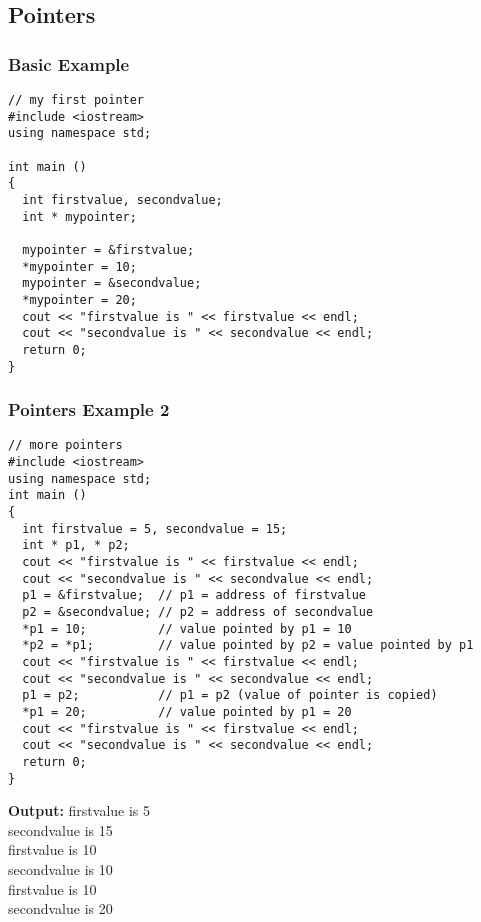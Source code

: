 \documentclass{beamer}
\newtheorem{Key points}{Key points}
\newcommand\Fontvia{\fontsize{6}{7.2}\selectfont}
\newcommand\Fontviaa{\fontsize{8}{7.2}\selectfont}
\begin{document}
\subsection{Pointers}
\begin{frame}[fragile]
\frametitle{Basic Example}
\Fontviaa
\begin{lstlisting}
// my first pointer
#include <iostream>
using namespace std;

int main ()
{
  int firstvalue, secondvalue;
  int * mypointer;

  mypointer = &firstvalue;
  *mypointer = 10;
  mypointer = &secondvalue;
  *mypointer = 20;
  cout << "firstvalue is " << firstvalue << endl;
  cout << "secondvalue is " << secondvalue << endl;
  return 0;
}
\end{lstlisting}
\end{frame}
\begin{frame}[fragile]
\frametitle{Pointers Example 2}
\Fontvia
\begin{lstlisting}
// more pointers
#include <iostream>
using namespace std;
int main ()
{
  int firstvalue = 5, secondvalue = 15;
  int * p1, * p2;
  cout << "firstvalue is " << firstvalue << endl;
  cout << "secondvalue is " << secondvalue << endl;
  p1 = &firstvalue;  // p1 = address of firstvalue
  p2 = &secondvalue; // p2 = address of secondvalue
  *p1 = 10;          // value pointed by p1 = 10
  *p2 = *p1;         // value pointed by p2 = value pointed by p1
  cout << "firstvalue is " << firstvalue << endl;
  cout << "secondvalue is " << secondvalue << endl;
  p1 = p2;           // p1 = p2 (value of pointer is copied)
  *p1 = 20;          // value pointed by p1 = 20
  cout << "firstvalue is " << firstvalue << endl;
  cout << "secondvalue is " << secondvalue << endl;
  return 0;
}
\end{lstlisting}
\textbf{{\color{blue}Output:}}
firstvalue is 5\\
secondvalue is 15\\
firstvalue is 10\\
secondvalue is 10\\
firstvalue is 10\\
secondvalue is 20\\
\end{frame}
\end{document}
